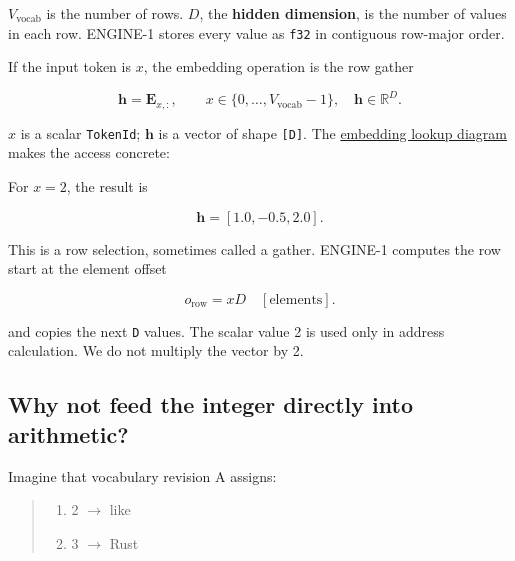 \(V_{\mathrm{vocab}}\) is the number of rows. \(D\), the \textbf{hidden
dimension}, is the number of values in each row. ENGINE-1 stores every
value as \texttt{f32} in contiguous row-major order.

If the input token is \(x\), the embedding operation is the row gather

\begin{equation}
\mathbf{h}=\mathbf{E}_{x,:},
\qquad x\in\{0,\ldots,V_{\mathrm{vocab}}-1\},
\quad \mathbf{h}\in\mathbb{R}^{D}.
\end{equation}

\(x\) is a scalar \texttt{TokenId}; \(\mathbf{h}\) is a vector of shape
\texttt{{[}D{]}}. The
\href{https://github.com/hermonai/inside-the-llm-engine/blob/astra-visual-rewrite/diagrams/model/embedding-row-lookup.txt}{embedding
lookup diagram} makes the access concrete:


For \(x=2\), the result is

\begin{equation}
\mathbf{h}=[1.0,-0.5,2.0].
\end{equation}

This is a row selection, sometimes called a gather. ENGINE-1 computes
the row start at the element offset

\begin{equation}
o_{\mathrm{row}}=xD\quad[\mathrm{elements}].
\end{equation}

and copies the next \texttt{D} values. The scalar value 2 is used only
in address calculation. We do not multiply the vector by 2.

\subsection{Why not feed the integer directly into
arithmetic?}\label{why-not-feed-the-integer-directly-into-arithmetic}

Imagine that vocabulary revision A assigns:

\begin{quote}
\begin{enumerate}
\item 2  \(\longrightarrow\)  like
\item 3  \(\longrightarrow\)  Rust
\end{enumerate}
\end{quote}

